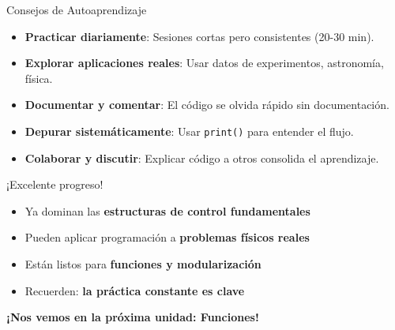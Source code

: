 \documentclass[10pt]{beamer}
\begin{document}
\begin{frame}{Consejos de Autoaprendizaje}
  \begin{itemize}
    \item \textbf{Practicar diariamente}: Sesiones cortas pero consistentes (20-30 min).
    \item \textbf{Explorar aplicaciones reales}: Usar datos de experimentos, astronomía, física.
    \item \textbf{Documentar y comentar}: El código se olvida rápido sin documentación.
    \item \textbf{Depurar sistemáticamente}: Usar \texttt{print()} para entender el flujo.
    \item \textbf{Colaborar y discutir}: Explicar código a otros consolida el aprendizaje.
  \end{itemize}
\end{frame}

\begin{frame}
  \Huge{\centerline{¡Excelente progreso!}}
  \vspace{0.3cm}
  \normalsize
  \begin{itemize}
    \item Ya dominan las \textbf{estructuras de control fundamentales}
    \item Pueden aplicar programación a \textbf{problemas físicos reales}
    \item Están listos para \textbf{funciones y modularización}
    \item Recuerden: \textbf{la práctica constante es clave}
  \end{itemize}
  
  \begin{center}
    \textbf{¡Nos vemos en la próxima unidad: Funciones!}
  \end{center}
\end{frame}
\end{document}
